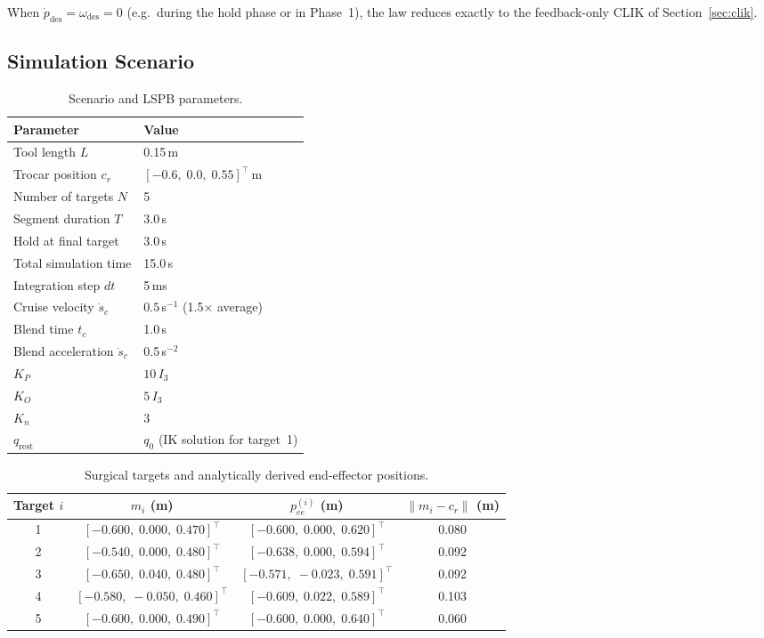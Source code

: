 \documentclass[11pt,a4paper]{article}
\begin{document}
When $\dot{p}_{\mathrm{des}}=\omega_{\mathrm{des}}=0$ (e.g.\ during the hold phase or
in Phase~1), the law reduces exactly to the feedback-only CLIK of Section~\ref{sec:clik}.

\subsection{Simulation Scenario}
\begin{table}[H]
  \centering
  \caption{Scenario and LSPB parameters.}
  \begin{tabular}{ll}
    \toprule
    Parameter & Value \\
    \midrule
    Tool length $L$              & 0.15\,m \\
    Trocar position $c_r$        & $[-0.6,\;0.0,\;0.55]^\top$\,m \\
    Number of targets $N$        & 5 \\
    Segment duration $T$         & 3.0\,s \\
    Hold at final target         & 3.0\,s \\
    Total simulation time        & 15.0\,s \\
    Integration step $dt$        & 5\,ms \\
    Cruise velocity $\dot{s}_c$  & $0.5$\,s$^{-1}$ (1.5$\times$ average) \\
    Blend time $t_c$             & 1.0\,s \\
    Blend acceleration $\ddot{s}_c$ & 0.5\,s$^{-2}$ \\
    $K_P$                        & $10\,I_3$ \\
    $K_O$                        & $5\,I_3$ \\
    $K_n$                        & 3 \\
    $q_{\mathrm{rest}}$          & $q_0$ (IK solution for target~1) \\
    \bottomrule
  \end{tabular}
\end{table}

\begin{table}[H]
  \centering
  \caption{Surgical targets and analytically derived end-effector positions.}
  \begin{tabular}{cccc}
    \toprule
    Target $i$ & $m_i$ (m) & $p_{ee}^{(i)}$ (m) & $\|m_i-c_r\|$ (m) \\
    \midrule
    1 & $[-0.600,\;0.000,\;0.470]^\top$ & $[-0.600,\;0.000,\;0.620]^\top$ & 0.080 \\
    2 & $[-0.540,\;0.000,\;0.480]^\top$ & $[-0.638,\;0.000,\;0.594]^\top$ & 0.092 \\
    3 & $[-0.650,\;0.040,\;0.480]^\top$ & $[-0.571,\;-0.023,\;0.591]^\top$ & 0.092 \\
    4 & $[-0.580,\;-0.050,\;0.460]^\top$ & $[-0.609,\;0.022,\;0.589]^\top$ & 0.103 \\
    5 & $[-0.600,\;0.000,\;0.490]^\top$ & $[-0.600,\;0.000,\;0.640]^\top$ & 0.060 \\
    \bottomrule
  \end{tabular}
\end{table}
\end{document}
